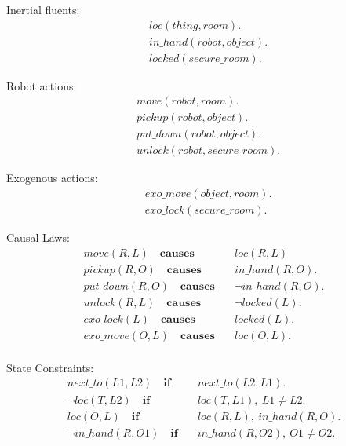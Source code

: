 \documentclass[11pt, oneside]{article}
\begin{document}
Inertial fluents:
\begin{align*}
  &loc(thing, room).\\
  &in\_hand(robot,object).\\
  &locked(secure\_room).
\end{align*}

Robot actions:
\begin{align*}
  &move(robot, room).\\
  &pickup(robot,object).\\
  &put\_down(robot,object).\\
  &unlock(robot,secure\_room).
\end{align*}

Exogenous actions:
\begin{align*}
  &exo\_move(object, room).\\
  &exo\_lock(secure\_room).
\end{align*}

Causal Laws:
\begin{align*}
  move(R,L)\quad \mathbf{causes}&\quad loc(R,L)\\
  pickup(R,O)\quad \mathbf{causes}&\quad in\_hand(R,O). \\
  put\_down(R,O)\quad \mathbf{causes}&\quad \neg in\_hand(R,O).\\
  unlock(R,L)\quad \mathbf{causes}&\quad \neg locked(L).\\
  exo\_lock(L)\quad \mathbf{causes}&\quad locked(L).\\
  exo\_move(O,L)\quad \mathbf{causes}&\quad loc(O,L).\\
\end{align*}


State Constraints:
\begin{align*}
  next\_to(L1,L2)\quad \mathbf{if}&\quad next\_to(L2,L1).\\
  \neg loc(T, L2)\quad \mathbf{if}&\quad loc(T, L1), ~L1 \neq L2.\\
  loc(O, L)\quad \mathbf{if}&\quad loc(R, L),~in\_hand(R,O).\\
  \neg in\_hand(R,O1)\quad \mathbf{if}&\quad in\_hand(R,O2),~ O1 \neq O2.
\end{align*}
\end{document}
